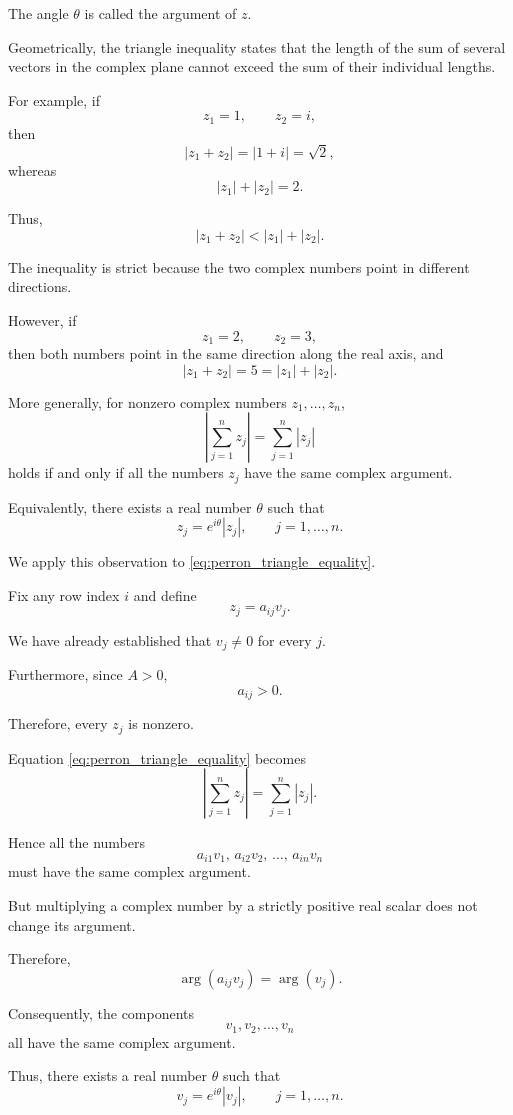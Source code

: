 \documentclass[11pt,a4paper]{article}
\theoremstyle{definition}
\theoremstyle{remark}
\begin{document}
The angle $\theta$ is called
the argument of $z$.

Geometrically, the triangle
inequality states that the length
of the sum of several vectors
in the complex plane cannot exceed
the sum of their individual lengths.

For example, if
\[
z_1=1,
\qquad
z_2=i,
\]
then
\[
|z_1+z_2|
=
|1+i|
=
\sqrt{2},
\]
whereas
\[
|z_1|+|z_2|=2.
\]

Thus,
\[
|z_1+z_2|<|z_1|+|z_2|.
\]

The inequality is strict because
the two complex numbers point
in different directions.

However, if
\[
z_1=2,
\qquad
z_2=3,
\]
then both numbers point in the
same direction along the real axis,
and
\[
|z_1+z_2|
=
5
=
|z_1|+|z_2|.
\]

More generally, for nonzero
complex numbers $z_1,\ldots,z_n$,
\begin{equation}
\left|\sum_{j=1}^{n}z_j\right|
=
\sum_{j=1}^{n}|z_j|
\label{eq:triangle_equality_condition}
\end{equation}
holds if and only if all the
numbers $z_j$ have the same
complex argument.

Equivalently, there exists
a real number $\theta$ such that
\[
z_j=e^{i\theta}|z_j|,
\qquad j=1,\ldots,n.
\]

We apply this observation to
\eqref{eq:perron_triangle_equality}.

Fix any row index $i$ and define
\[
z_j=a_{ij}v_j.
\]

We have already established that
$v_j\neq0$ for every $j$.

Furthermore, since $A>0$,
\[
a_{ij}>0.
\]

Therefore, every $z_j$ is nonzero.

Equation
\eqref{eq:perron_triangle_equality}
becomes
\[
\left|\sum_{j=1}^{n}z_j\right|
=
\sum_{j=1}^{n}|z_j|.
\]

Hence all the numbers
\[
a_{i1}v_1,\,
a_{i2}v_2,\,
\ldots,\,
a_{in}v_n
\]
must have the same complex argument.

But multiplying a complex number
by a strictly positive real scalar
does not change its argument.

Therefore,
\[
\arg(a_{ij}v_j)=\arg(v_j).
\]

Consequently, the components
\[
v_1,v_2,\ldots,v_n
\]
all have the same complex argument.

Thus, there exists a real
number $\theta$ such that
\begin{equation}
\boxed{
v_j=e^{i\theta}|v_j|,
\qquad j=1,\ldots,n.
}
\end{equation}
\end{document}
